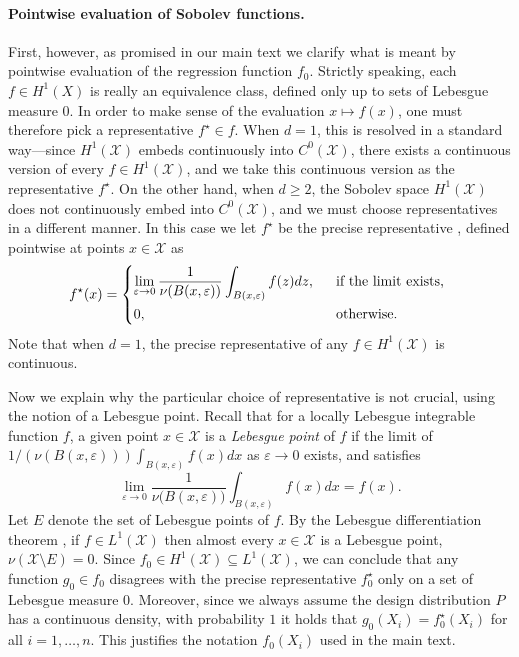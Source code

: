 \documentclass[twoside]{article}
\newcommand{\1}{\mathbf{1}}
\newcommand{\Leb}{L}
\newcommand{\mc}[1]{\mathcal{#1}}
\theoremstyle{definition}
\theoremstyle{remark}
\begin{document}
\paragraph{Pointwise evaluation of Sobolev functions.}
First, however, as promised in our main text we clarify what is meant by pointwise evaluation of the regression function $f_0$. Strictly speaking, each $f \in H^1(X)$ is really an equivalence class, defined only up to sets of Lebesgue measure 0. In order to make sense of the evaluation $x \mapsto f(x)$, one must therefore pick a representative $f^{\star} \in f$. When $d = 1$, this is resolved in a standard way---since $H^1(\mc{X})$ embeds continuously into $C^0(\mc{X})$, there exists a continuous version of every $f \in H^1(\mc{X})$, and we take this continuous version as the representative $f^{\star}$. On the other hand, when $d \geq 2$, the Sobolev space $H^1(\mc{X})$ does not continuously embed into $C^0(\mc{X})$, and we must choose representatives in a different manner. In this case we let $f^{\star}$ be the precise representative \citep{evans15}, defined pointwise at points $x \in \mc{X}$ as
\begin{equation*}
f^{\star}(x) = 
\begin{dcases*}
\lim_{\varepsilon \to 0} \frac{1}{\nu(B(x,\varepsilon))} \int_{B(x,\varepsilon)} f(z) dz,&~~\textrm{if the limit exists,} \\
0,&~~\textrm{otherwise.}
\end{dcases*}
\end{equation*}
Note that when $d = 1$, the precise representative of any $f \in H^1(\mc{X})$ is continuous. 

Now we explain why the particular choice of representative is not crucial, using the notion of a Lebesgue point. Recall that for a locally Lebesgue integrable function $f$, a given point $x \in \mc{X}$ is a \emph{Lebesgue point} of $f$ if the limit of $1/(\nu(B(x,\varepsilon)))\int_{B(x,\varepsilon)} f(x) dx$ as $\varepsilon \to 0$ exists, and satisfies
\begin{equation*}
\lim_{\varepsilon \to 0} \frac{1}{\nu\bigl(B(x,\varepsilon)\bigr)} \int_{B(x,\varepsilon)} f(x) dx = f(x).
\end{equation*}
Let $E$ denote the set of Lebesgue points of $f$. By the Lebesgue differentiation theorem \citep{evans15}, if $f \in L^1(\mc{X})$ then almost every $x \in \mc{X}$ is a Lebesgue point, $\nu(\mc{X}\setminus E) = 0$. Since $f_0 \in H^1(\mc{X}) \subseteq \Leb^1(\mc{X})$, we can conclude that any function $g_0 \in f_0$ disagrees with the precise representative $f_0^{\star}$ only on a set of Lebesgue measure 0. Moreover, since we always assume the design distribution $P$ has a continuous density, with probability $1$ it holds that $g_0(X_i) = f_0^{\star}(X_i)$ for all $i = 1,\ldots,n$. This justifies the notation $f_0(X_i)$ used in the main text.
\end{document}
